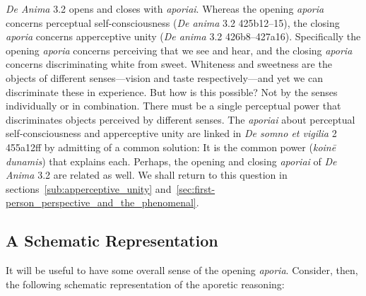 \emph{De Anima} 3.2 opens and closes with \emph{aporiai}. Whereas the opening \emph{aporia} concerns perceptual self-consciousness (\emph{De anima} 3.2 425b12–15), the closing \emph{aporia} concerns apperceptive unity (\emph{De anima} 3.2 426b8–427a16). Spe\-cifically the opening \emph{aporia} concerns perceiving that we see and hear, and the closing \emph{aporia} concerns discriminating white from sweet. Whiteness and sweetness are the objects of different senses—vision and taste respectively—and yet we can discriminate these in experience. But how is this possible? Not by the senses individually or in combination. There must be a single perceptual power that discriminates objects perceived by different senses. The \emph{aporiai} about perceptual self-consciousness and apperceptive unity are linked in \emph{De somno et vigilia} 2 455a12ff by admitting of a common solution: It is the common power (\emph{koinē dunamis}) that explains each. Perhaps, the opening and closing \emph{aporiai} of \emph{De Anima} 3.2 are related as well. We shall return to this question in sections~\ref{sub:apperceptive_unity} and~\ref{sec:first-person_perspective_and_the_phenomenal}.

\subsection{A Schematic Representation} %
\label{sub:a_schematic_representation}

It will be useful to have some overall sense of the opening \emph{aporia}. Consider, then, the following schematic representation of the aporetic reasoning:

